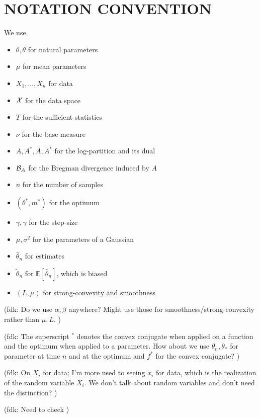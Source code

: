 \documentclass[twoside]{article}
\let\oldsection\section
\renewcommand{\section}[1]{\oldsection{\texorpdfstring{\uppercase{#1}}{#1}}}
\newcommand{\fdk}[1]{\textcolor{Periwinkle}{(fdk:#1)}}
\newcommand*{\expect}[2][]{\ensuremath{\mathbb{E}_{#1} \left[ #2 \right] }} %
\newcommand{\logpart}{A}
\newcommand{\conj}{\logpart^*}
\newcommand{\nat}{\theta}
\newcommand{\m}{\mu}
\newcommand{\lr}{\gamma} %
\begin{document}
\section{Notation convention}
We use
\begin{itemize}
	\item $\theta, \nat$ for natural parameters
	\item $\m$ for mean parameters
	\item $X_1,\ldots,X_n$ for data
	\item ${\mathcal X}$ for the data space
	\item $T$ for the sufficient statistics
	\item $\nu$ for the base measure
	\item $A, A^*, \logpart, \conj$ for the log-partition and its dual
	\item ${\mathcal B}_A$ for the Bregman divergence induced by $A$
	\item $n$ for the number of samples
	\item $(\theta^*,m^*)$ for the optimum
	\item $\gamma, \lr$ for the step-size
	\item $\mu,\sigma^2$ for the parameters of a Gaussian
	\item $\hat\theta_n$ for estimates
	\item $\tilde\theta_n$ for $\expect{\hat\theta_n}$, which is biased
	\item $(L, \mu)$ for strong-convexity and smoothness
\end{itemize}

\fdk{
	Do we use $\alpha, \beta$ anywhere?
	Might use those for smoothness/strong-convexity rather than $\mu, L$.
}

\fdk{
	The superscript ${}^*$ denotes the convex conjugate when applied on a function
	and the optimum when applied to a parameter.
	How about we use $\theta_n, \theta_*$ for parameter at time $n$ and at the optimum
	and $f^*$ for the convex conjugate?
}

\fdk{
	On $X_i$ for data; I'm more used to seeing $x_i$ for data, which is the realization of the random variable $X_i$.
	We don't talk about random variables and don't need the distinction?
}

\fdk{
	Need to check
}
\end{document}
